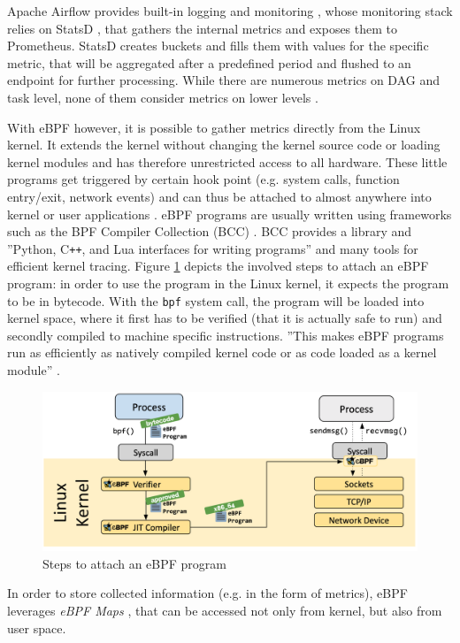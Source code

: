 \documentclass[a4paper,journal]{IEEEtran}
\begin{document}
Apache Airflow provides built-in logging and monitoring \cite{airflowMonitoring}, whose monitoring stack relies on StatsD \cite{statsd}, that gathers the internal metrics and exposes them to Prometheus. StatsD creates buckets and fills them with values for the specific metric, that will be aggregated after a predefined period and flushed to an endpoint for further processing. While there are numerous metrics on DAG and task level, none of them consider metrics on lower levels \cite{airflowMetrics}.

With eBPF \cite{ebpf} however, it is possible to gather metrics directly from the Linux kernel. It extends the kernel without changing the kernel source code or loading kernel modules and has therefore unrestricted access to all hardware. These little programs get triggered by certain hook point (e.g. system calls, function entry/exit, network events) and can thus be attached to almost anywhere into kernel or user applications \cite{whatebpf}. eBPF programs are usually written using frameworks such as the BPF Compiler Collection (BCC) \cite{bcc}. BCC provides a library and ''Python, C\texttt{++}, and Lua interfaces for writing programs''\cite{cassagnes2020riseebpfnonintrusive} and many tools for efficient kernel tracing.
Figure \ref{fig:ebpf:steps} depicts the involved steps to attach an eBPF program: in order to use the program in the Linux kernel, it expects the program to be in bytecode. With the \texttt{bpf} system call, the program will be loaded into kernel space, where it first has to be verified (that it is actually safe to run) and secondly compiled to machine specific instructions. ''This makes eBPF programs run as efficiently as natively compiled kernel code or as code loaded as a kernel module'' \cite{whatebpf}.
\begin{figure}[H]
	\includegraphics[width=\linewidth]{images/ebpf-steps.png}
	\caption{Steps to attach an eBPF program \cite{whatebpf}}
	\label{fig:ebpf:steps}
\end{figure}
In order to store collected information (e.g. in the form of metrics), eBPF leverages \textit{eBPF Maps} \cite{ebpfMaps}, that can be accessed not only from kernel, but also from user space.
\end{document}

